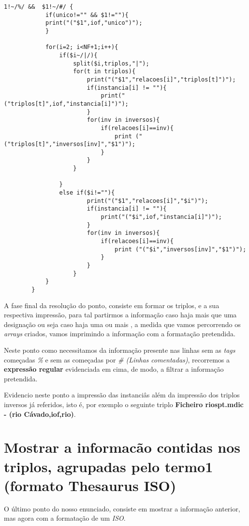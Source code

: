 \documentclass{report}
\def\titulo#1{\section{#1}}
\begin{document}
\begin{verbatim}
1!~/%/ &&  $1!~/#/ {    
            if(unico!="" && $1!=""){
            print("("$1",iof,"unico")");
            }

            for(i=2; i<NF+1;i++){
                if($i~/|/){
                    split($i,triplos,"|");
                    for(t in triplos){
                        print("("$1","relacoes[i]","triplos[t]")");
                        if(instancia[i] != ""){
                            print("("triplos[t]",iof,"instancia[i]")");
                        }
                        for(inv in inversos){
                            if(relacoes[i]==inv){
                                print ("("triplos[t]","inversos[inv]","$1")");
                            }
                        }
                    }

                }
                else if($i!=""){
                        print("("$1","relacoes[i]","$i")");
                        if(instancia[i] != ""){
                            print("("$i",iof,"instancia[i]")");
                        }
                        for(inv in inversos){
                            if(relacoes[i]==inv){
                                print ("("$i","inversos[inv]","$1")");
                            }
                        }
                    }
            }
        }
\end{verbatim}

    A fase final da resolução do ponto, consiste em formar os triplos, e a sua respectiva impressão, para tal partirmos a informação caso haja mais que uma designação ou seja caso haja uma ou mais \textbf{\textbar}, a medida que vamos percorrendo os \textit{arrays} criados, vamos imprimindo a informação com a formatação pretendida.
    
    Neste ponto como necessitamos da informação presente nas linhas sem as \textit{tags} começadas \textit{\%} e sem as começadas por \textit{\# (Linhas comentadas)}, recorremos a \textbf{expressão regular} evidenciada em cima, de modo, a filtrar a informação pretendida. 

    Evidencio neste ponto a impressão das instanciâs além da impressão dos triplos inversos já referidos, isto é, por exemplo o seguinte triplo \textbf{Ficheiro riospt.mdic - (rio Cávado,iof,rio)}.


\titulo{ Mostrar a informacão contidas nos triplos, agrupadas pelo termo1 (formato Thesaurus ISO) }

    O último ponto do nosso enunciado, consiste em mostrar a informação anterior, mas agora com a formatação de um \textit{ISO}.
\end{document}
